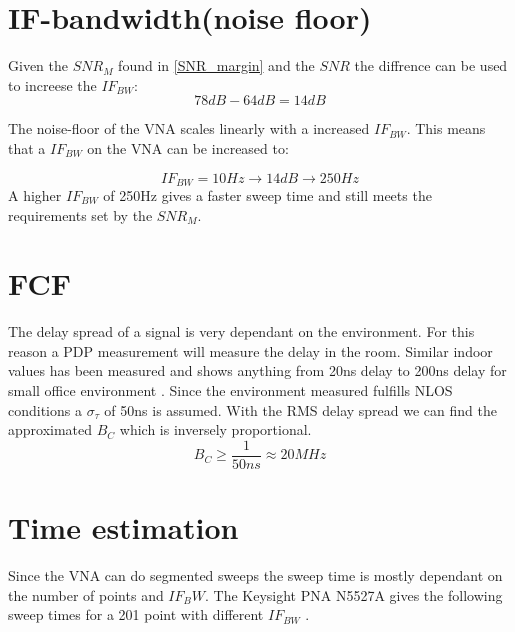 


\section{IF-bandwidth(noise floor)}
Given the $SNR_{M}$ found in \autoref{SNR_margin} and the $SNR$ the diffrence can be used to increese the $IF_{BW}$:
\begin{equation}
  78dB-64dB = 14dB 
\end{equation}

The noise-floor of the \gls{VNA} scales linearly with a increased $IF_{BW}$\citep{PNA_scale}. This means that a $IF_{BW}$ on the \gls{VNA} can be increased to:

\begin{equation}
IF_{BW} = 10Hz \rightarrow 14dB \rightarrow 250Hz
\end{equation}
A higher $IF_{BW}$ of 250Hz  gives a faster sweep time and still meets the requirements set by the $SNR_M$.
\section{FCF}
The delay spread of a signal is very dependant on the environment. For this reason a PDP measurement will measure the delay in the room. Similar indoor values has been measured and shows anything from 20ns delay to 200ns delay for small office environment \citep{indoor_delay}. Since the environment measured fulfills NLOS conditions a $\sigma_{\tau}$ of 50ns is assumed. With the RMS delay spread we can find the approximated $B_C$ which is inversely proportional. 
\begin{equation}
B_C \geq \frac{1}{50ns} \approx 20MHz
\label{CohBW}
\end{equation}
\section{Time estimation}
Since the \gls{VNA} can do segmented sweeps the sweep time is mostly dependant on the number of points and $IF_BW$.
The Keysight PNA N5527A gives the following sweep times for a 201 point with different $IF_{BW}$ \citep{Key_PNA}. \\

